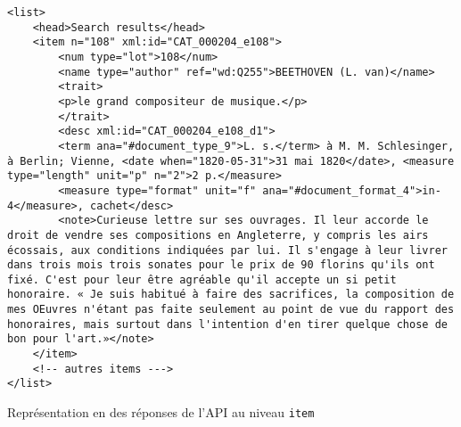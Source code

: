 \begin{listing}[h!]
	\begin{verbatim}
<list>
	<head>Search results</head>
	<item n="108" xml:id="CAT_000204_e108">
		<num type="lot">108</num>
		<name type="author" ref="wd:Q255">BEETHOVEN (L. van)</name>
		<trait>
		<p>le grand compositeur de musique.</p>
		</trait>
		<desc xml:id="CAT_000204_e108_d1">
		<term ana="#document_type_9">L. s.</term> à M. M. Schlesinger, à Berlin; Vienne, <date when="1820-05-31">31 mai 1820</date>, <measure type="length" unit="p" n="2">2 p.</measure>
		<measure type="format" unit="f" ana="#document_format_4">in-4</measure>, cachet</desc>
		<note>Curieuse lettre sur ses ouvrages. Il leur accorde le droit de vendre ses compositions en Angleterre, y compris les airs écossais, aux conditions indiquées par lui. Il s'engage à leur livrer dans trois mois trois sonates pour le prix de 90 florins qu'ils ont fixé. C'est pour leur être agréable qu'il accepte un si petit honoraire. « Je suis habitué à faire des sacrifices, la composition de mes OEuvres n'étant pas faite seulement au point de vue du rapport des honoraires, mais surtout dans l'intention d'en tirer quelque chose de bon pour l'art.»</note>
	</item>
	<!-- autres items --->
</list>
	\end{verbatim}
	\caption{Représentation en \xmltei{} des réponses de l'API au niveau \texttt{item}}
	\label{code:api_item_tei}
\end{listing}

